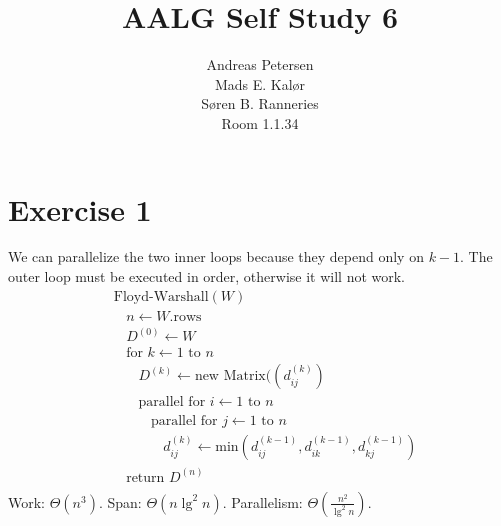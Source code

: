 \documentclass[koma,a4paper]{article}
\title{AALG Self Study 6}
\author{Andreas Petersen\\
Mads E. Kalør\\
Søren B. Ranneries\\
Room 1.1.34}
\begin{document}
\maketitle

\pagebreak

\section{Exercise 1}
We can parallelize the two inner loops because they depend only on $k-1$. The outer loop must be executed in order, otherwise it will not work.
\begin{align*}
  &\text{Floyd-Warshall}(W)\\
  &~~~~n \leftarrow W.\text{rows}\\
  &~~~~D^{(0)} \leftarrow W\\
  &~~~~\text{for } k \leftarrow 1 \text{ to } n\\
  &~~~~~~~~D^{(k)} \leftarrow \text{new Matrix(}(d_{ij}^{(k)})\\
  &~~~~~~~~\text{parallel for } i \leftarrow 1 \text{ to } n\\
  &~~~~~~~~~~~~\text{parallel for } j \leftarrow 1 \text{ to } n\\
  &~~~~~~~~~~~~~~~~d_{ij}^{(k)} \leftarrow \text{min}(d_{ij}^{(k-1)}, d_{ik}^{(k-1)}, d_{kj}^{(k-1)})\\
  &~~~~\text{return } D^{(n)}\\
\end{align*}
Work: $\Theta(n^3)$. Span: $\Theta(n \lg^2 n)$. Parallelism: $\Theta(\frac{n^2}{\lg^2 n})$.
\end{document}
